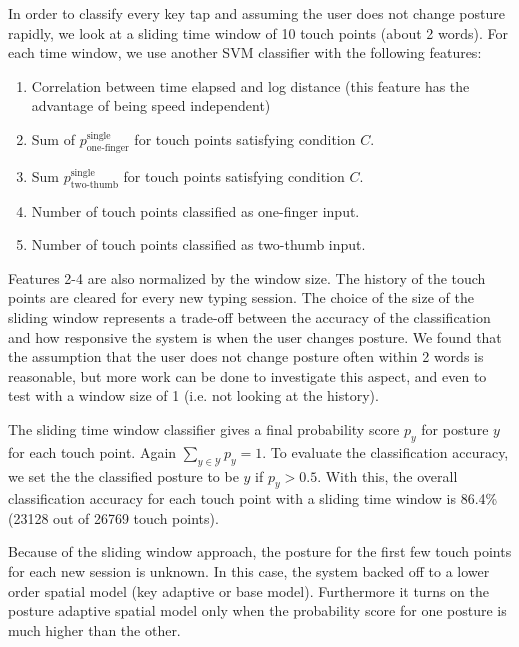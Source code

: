 \documentclass{sigchi}
\begin{document}
In order to classify every key tap and assuming the user does not change posture 
rapidly, we look at a sliding time window of 10 touch points (about 2 words). For 
each time window, we use another SVM classifier with the following features:
\begin{enumerate}
\item Correlation between time elapsed and log distance (this feature has the
advantage of being speed independent)
\item Sum of $p_\text{one-finger}^{\text{single}}$ for touch points satisfying condition $C$.
\item Sum $p_\text{two-thumb}^{\text{single}}$ for touch points satisfying condition $C$.
\item Number of touch points classified as one-finger input.
\item Number of touch points classified as two-thumb input.
\end{enumerate}
Features 2-4 are also normalized by the window size. The history of the touch points are cleared for every new typing session.
The choice of the size of the sliding window represents a trade-off between the 
accuracy of the classification and how responsive the system is when the user
changes posture. We found that the assumption that the user does not change posture
often within 2 words is reasonable, but more work can be done to investigate this
aspect, and even to test with a window size of 1 (i.e. not 
looking at the history).

The sliding time window classifier gives a final probability score $p_y$ for posture
$y$ for each touch point. Again $\displaystyle\sum_{y\in \mathcal{Y}}p_y = 1$.
To evaluate the classification accuracy, we set the the classified posture to be $y$ if $p_y > 0.5$. With this, the overall classification 
accuracy for each touch point with a sliding time window
is 86.4\% (23128 out of 26769 touch points).

Because of the sliding window approach, the posture for the first few touch points  
for each new session is unknown. In this case, the system backed off to a lower order spatial 
model (key adaptive or base model). Furthermore  it turns on the posture 
adaptive spatial model only when the probability score for one posture is much 
higher than the other.

\end{document}
